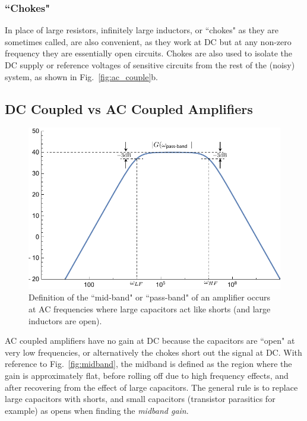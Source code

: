 \subsubsection{``Chokes"}
In place of large resistors, infinitely large inductors, or ``chokes" as they are sometimes called, are also convenient, as they work at DC but at any non-zero frequency they are essentially open circuits.  Chokes are also used to isolate the DC supply or reference voltages of sensitive circuits from the rest of the (noisy) system, as shown in Fig.~\ref{fig:ac_couple}b.
\subsection{DC Coupled vs AC Coupled Amplifiers}
\begin{figure}[tb]
\centering
\includegraphics[width=.6\columnwidth]{amp_bandpass}
\caption{Definition of the ``mid-band" or ``pass-band" of an amplifier occurs at AC frequencies where large capacitors act like shorts (and large inductors are open).}
\label{fig:cgamp_is}
\end{figure}
AC coupled amplifiers have no gain at DC because the capacitors are ``open" at very low frequencies, or alternatively the chokes short out the signal at DC.  With reference to Fig.~\ref{fig:midband}, the midband is defined as the region where the gain is approximately flat, before rolling off due to high frequency effects, and after recovering from the effect of large capacitors. The general rule is to replace large capacitors with shorts, and small capacitors (transistor parasitics for example) as opens when finding the \emph{midband gain}. 
